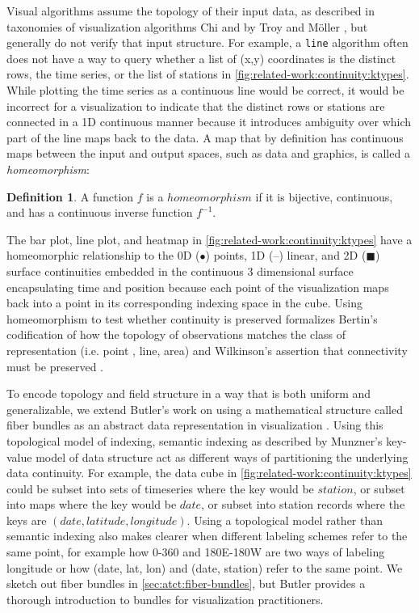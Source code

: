 \documentclass[journal]{IEEEtran}
\theoremstyle{definition}
\newtheorem{definition}{Definition}[section]
\theoremstyle{remark}
\begin{document}
Visual algorithms assume the topology of their input data, as described in taxonomies of visualization algorithms Chi\cite{chiTaxonomyVisualizationTechniques2000} and by Troy and M\"{o}ller \cite{toryRethinkingVisualizationHighlevel2004}, but generally do not verify that input structure. For example, a \texttt{line} algorithm often does not have a way to query whether a list of (x,y) coordinates is the distinct rows, the time series, or the list of stations in \autoref{fig:related-work:continuity:ktypes}. While plotting the time series as a continuous line would be correct, it would be incorrect for a visualization to indicate that the distinct rows or stations are connected in a 1D continuous manner because it introduces ambiguity over which part of the line maps back to the data. A map that by definition has continuous maps between the input and output spaces, such as data and graphics, is called a \textit{homeomorphism}\cite{riehlCategoryTheoryContext}:

\begin{definition}
  A function $f$ is a $homeomorphism$ if it is bijective, continuous, and has a continuous inverse function $f^{-1}$.
\end{definition}

The bar plot, line plot, and heatmap in \autoref{fig:related-work:continuity:ktypes} have a homeomorphic relationship to the 0D ($\bullet$) points, 1D (--) linear, and 2D ($\blacksquare$) surface continuities embedded in the continuous 3 dimensional surface encapsulating time and position because each point of the visualization maps back into a point in its corresponding indexing space in the cube. Using homeomorphism to test whether continuity is preserved formalizes Bertin's codification of how the topology of observations matches the class of representation (i.e. point , line, area) \cite{bertinSemiologyGraphicsDiagrams2011} and Wilkinson's assertion that connectivity must be preserved \cite{wilkinsonGrammarGraphics2005}.

To encode topology and field structure in a way that is both uniform and generalizable, we extend Butler's work on using a mathematical structure called fiber bundles as an abstract data representation in visualization \cite{butlerVectorBundleClassesForm1992, butlerVisualizationModelBased1989}. Using this topological model of indexing, semantic indexing as described by Munzner's key-value model of data structure \cite{munznerWhatDataAbstraction2014} act as different ways of partitioning the underlying data continuity. For example, the data cube in \autoref{fig:related-work:continuity:ktypes} could be subset into sets of timeseries where the key would be $station$, or subset into maps where the key would be $date$, or subset into station records where the keys are $(date, latitude, longitude)$. Using a topological model rather than semantic indexing also makes clearer when different labeling schemes refer to the same point, for example how 0-360 and 180E-180W are two ways of labeling longitude or how (date, lat, lon) and (date, station) refer to the same point. We sketch out fiber bundles in \autoref{sec:atct:fiber-bundles}, but Butler provides a thorough introduction to bundles for visualization practitioners.
\end{document}
